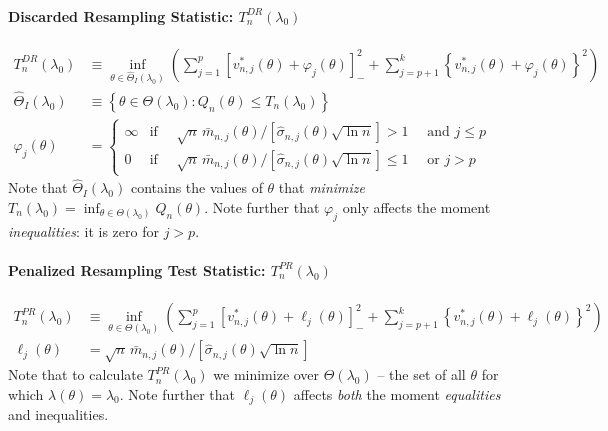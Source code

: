 \documentclass[12pt]{article}
\begin{document}
\paragraph{Discarded Resampling Statistic: $T_n^{DR}(\lambda_0)$}
\begin{align*}
  T_n^{DR}(\lambda_0) &\equiv \inf_{\theta \in \widehat{\Theta}_I(\lambda_0)}\left(\sum_{j=1}^p \left[ v_{n,j}^*(\theta) + \varphi_j(\theta) \right]_{-}^2 + \sum_{j=p+1}^{k}\left\{   v^*_{n,j}(\theta) + \varphi_j(\theta)\right\}^2  \right)\\
  \widehat{\Theta}_I(\lambda_0) &\equiv \left\{ \theta\in \Theta(\lambda_0)\colon Q_n(\theta) \leq T_n(\lambda_0) \right\}\\
  \varphi_j(\theta) &= \left\{
  \begin{array}{ll}
    \infty & \mbox{if } \quad \sqrt{n}\, \bar{m}_{n,j}(\theta)/[ \widehat{\sigma}_{n,j}(\theta) \sqrt{\ln n}] > 1 \quad \mbox{ and } j \leq p\\
    0 & \mbox{if } \quad \sqrt{n}\, \bar{m}_{n,j}(\theta)/[ \widehat{\sigma}_{n,j}(\theta) \sqrt{\ln n}]  \leq 1 \quad \mbox{ or } j > p
  \end{array}
  \right.
\end{align*}
Note that $\widehat{\Theta}_I(\lambda_0)$ contains the values of $\theta$ that \emph{minimize} $T_n(\lambda_0) = \inf_{\theta \in \Theta(\lambda_0)} Q_n(\theta)$.
Note further that $\varphi_j$ only affects the moment \emph{inequalities}: it is zero for $j > p$.

\paragraph{Penalized Resampling Test Statistic: $T_n^{PR}(\lambda_0)$}
\begin{align*}
  T_n^{PR}(\lambda_0) &\equiv \inf_{\theta \in \Theta(\lambda_0)}\left(\sum_{j=1}^p \left[ v_{n,j}^*(\theta) + \ell_j(\theta) \right]_{-}^2 + \sum_{j=p+1}^{k}\left\{   v^*_{n,j}(\theta) + \ell_j(\theta)\right\}^2  \right)\\
  \ell_j(\theta) &= \sqrt{n}\, \bar{m}_{n,j}(\theta)/\left[ \widehat{\sigma}_{n,j}(\theta) \sqrt{\ln n} \right] 
\end{align*}
Note that to calculate $T_n^{PR}(\lambda_0)$ we minimize over $\Theta(\lambda_0)$ -- the set of all $\theta$ for which $\lambda(\theta) = \lambda_0$.
Note further that $\ell_j(\theta)$ affects \emph{both} the moment \emph{equalities} and inequalities.
\end{document}
